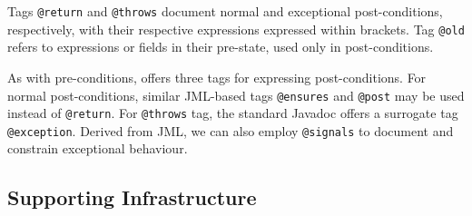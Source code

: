 Tags \lstinline!@return! and \lstinline!@throws! document normal and exceptional post-conditions, respectively, with their respective expressions
expressed within brackets.
Tag \lstinline!@old! refers to expressions or fields in their pre-state, used only in post-conditions.

As with pre-conditions, \contractjdoc{} offers three tags for expressing post-conditions.
For normal post-conditions, similar JML-based tags \lstinline!@ensures! and \lstinline!@post! may be used instead of \lstinline!@return!.
For \lstinline!@throws! tag, the standard Javadoc offers a surrogate tag \lstinline!@exception!. 
Derived from JML, we can also employ \lstinline!@signals! to document and constrain exceptional behaviour.



\subsection{Supporting Infrastructure}

